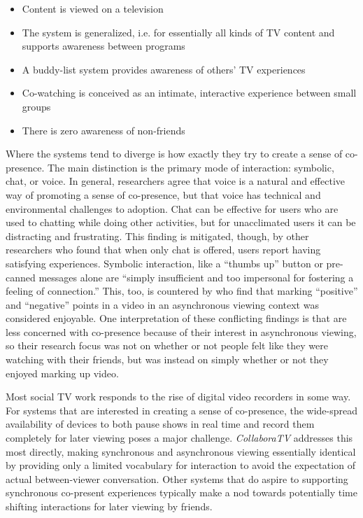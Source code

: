 \begin{itemize}
	\item Content is viewed on a television
	\item The system is generalized, i.e. for essentially all kinds of TV content and supports awareness between programs
	\item A buddy-list system provides awareness of others' TV experiences
	\item Co-watching is conceived as an intimate, interactive experience between small groups
	\item There is zero awareness of non-friends 
\end{itemize}
	
Where the systems tend to diverge is how exactly they try to create a sense of co-presence. The main distinction is the primary mode of interaction: symbolic, chat, or voice. In general, researchers agree that voice is a natural and effective way of promoting a sense of co-presence, but that voice has technical and environmental challenges to adoption. Chat can be effective for users who are used to chatting while doing other activities, but for unacclimated users it can be distracting and frustrating. \citep{compare.voice.tex} This finding is mitigated, though, by other researchers who found that when only chat is offered, users report having satisfying experiences. \citep{regan2004media} Symbolic interaction, like a ``thumbs up'' button or pre-canned messages alone are ``simply insufficient and too impersonal for fostering a feeling of connection.'' \citep{examiningpresence} This, too, is countered by  who find that marking ``positive'' and ``negative'' points in a video in an asynchronous viewing context was considered enjoyable. One interpretation of these conflicting findings is that \citet{compare.voice.tex} are less concerned with co-presence because of their interest in asynchronous viewing, so their research focus was not on whether or not people felt like they were watching with their friends, but was instead on simply whether or not they enjoyed marking up video.

Most social TV work responds to the rise of digital video recorders in some way. For systems that are interested in creating a sense of co-presence, the wide-spread availability of devices to both pause shows in real time and record them completely for later viewing poses a major challenge. \emph{CollaboraTV} \citep{harrison2007collaboratv} addresses this most directly, making synchronous and asynchronous viewing essentially identical by providing only a limited vocabulary for interaction to avoid the expectation of actual between-viewer conversation. Other systems that do aspire to supporting synchronous co-present experiences typically make a nod towards potentially time shifting interactions for later viewing by friends.

